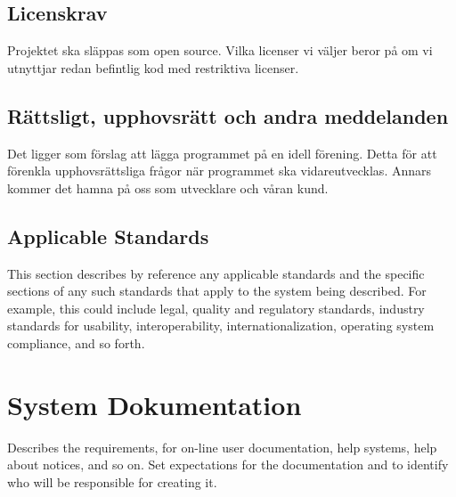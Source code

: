 \subsection{Licenskrav}
Projektet ska släppas som open source. Vilka licenser vi väljer beror på om vi utnyttjar redan befintlig kod med restriktiva licenser.

\subsection{Rättsligt, upphovsrätt och andra meddelanden}
Det ligger som förslag att lägga programmet på en idell förening. Detta för att förenkla upphovsrättsliga frågor när programmet ska vidareutvecklas. Annars kommer det hamna på oss som utvecklare och våran kund. 

\subsection{Applicable Standards}
This section describes by reference any applicable standards and the specific sections of any such standards that apply to the system being described. For example, this could include legal, quality and regulatory standards, industry standards for usability, interoperability, internationalization, operating system compliance, and so forth.

\section{System Dokumentation}
Describes the requirements, for on-line user documentation, help systems, help about notices, and so on. Set expectations for the documentation and to identify who will be responsible for creating it.


